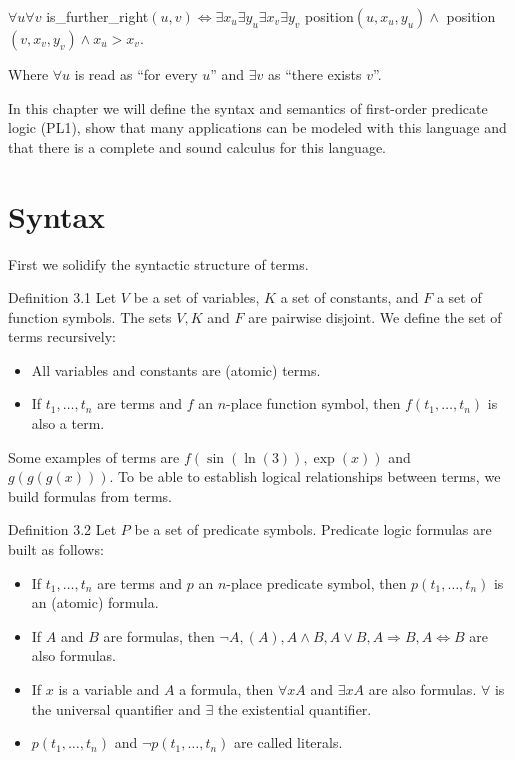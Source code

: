 \documentclass[10pt]{book}
\begin{document}
$\forall u \forall v$ is\_further\_right$(u, v) \Leftrightarrow \exists x_{u} \exists y_{u} \exists x_{v} \exists y_{v}$ position$(u, x_{u}, y_{u}) \wedge$ position$(v, x_{v}, y_{v}) \wedge x_{u}>x_{v}$.

Where $\forall u$ is read as ``for every $u$'' and $\exists v$ as ``there exists $v$''.

In this chapter we will define the syntax and semantics of first-order predicate logic (PL1), show that many applications can be modeled with this language and that there is a complete and sound calculus for this language.

\section{Syntax}
First we solidify the syntactic structure of terms.

Definition 3.1 Let $V$ be a set of variables, $K$ a set of constants, and $F$ a set of function symbols. The sets $V, K$ and $F$ are pairwise disjoint. We define the set of terms recursively:

\begin{itemize}
  \item All variables and constants are (atomic) terms.
  \item If $t_{1}, \ldots, t_{n}$ are terms and $f$ an $n$-place function symbol, then $f\left(t_{1}, \ldots, t_{n}\right)$ is also a term.
\end{itemize}

Some examples of terms are $f(\sin (\ln (3)), \exp (x))$ and $g(g(g(x)))$. To be able to establish logical relationships between terms, we build formulas from terms.

Definition 3.2 Let $P$ be a set of predicate symbols. Predicate logic formulas are built as follows:

\begin{itemize}
  \item If $t_{1}, \ldots, t_{n}$ are terms and $p$ an $n$-place predicate symbol, then $p\left(t_{1}, \ldots, t_{n}\right)$ is an (atomic) formula.
  \item If $A$ and $B$ are formulas, then $\neg A,(A), A \wedge B, A \vee B, A \Rightarrow B, A \Leftrightarrow B$ are also formulas.
  \item If $x$ is a variable and $A$ a formula, then $\forall x A$ and $\exists x A$ are also formulas. $\forall$ is the universal quantifier and $\exists$ the existential quantifier.
  \item $p\left(t_{1}, \ldots, t_{n}\right)$ and $\neg p\left(t_{1}, \ldots, t_{n}\right)$ are called literals.
\end{itemize}
\end{document}
